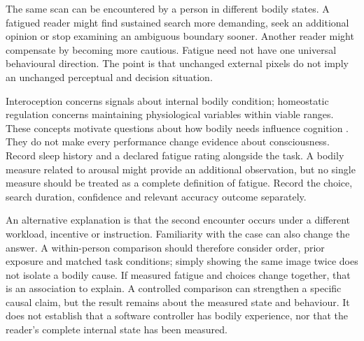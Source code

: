 \biomedicalanswer
{}
The same scan can be encountered by a person in different bodily states. A fatigued reader might find sustained search more demanding, seek an additional opinion or stop examining an ambiguous boundary sooner. Another reader might compensate by becoming more cautious. Fatigue need not have one universal behavioural direction. The point is that unchanged external pixels do not imply an unchanged perceptual and decision situation.

Interoception concerns signals about internal bodily condition; homeostatic regulation concerns maintaining physiological variables within viable ranges. These concepts motivate questions about how bodily needs influence cognition \citep{seth2013,sethbayne2022}. They do not make every performance change evidence about consciousness.
Record sleep history and a declared fatigue rating alongside the task. A bodily measure related to arousal might provide an additional observation, but no single measure should be treated as a complete definition of fatigue. Record the choice, search duration, confidence and relevant accuracy outcome separately.

An alternative explanation is that the second encounter occurs under a different workload, incentive or instruction. Familiarity with the case can also change the answer. A within-person comparison should therefore consider order, prior exposure and matched task conditions; simply showing the same image twice does not isolate a bodily cause.
If measured fatigue and choices change together, that is an association to explain. A controlled comparison can strengthen a specific causal claim, but the result remains about the measured state and behaviour. It does not establish that a software controller has bodily experience, nor that the reader's complete internal state has been measured.

